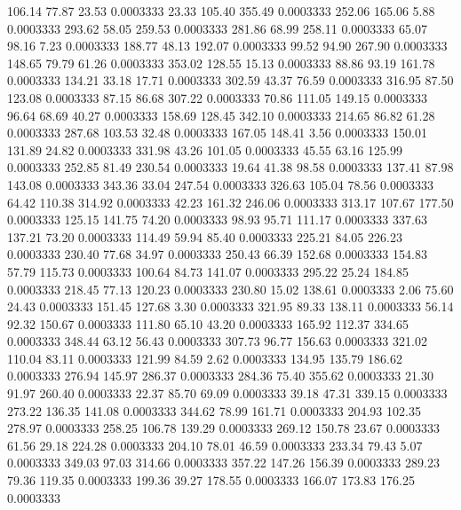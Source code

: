  106.14   77.87   23.53   0.0003333
  23.33  105.40  355.49   0.0003333
 252.06  165.06    5.88   0.0003333
 293.62   58.05  259.53   0.0003333
 281.86   68.99  258.11   0.0003333
  65.07   98.16    7.23   0.0003333
 188.77   48.13  192.07   0.0003333
  99.52   94.90  267.90   0.0003333
 148.65   79.79   61.26   0.0003333
 353.02  128.55   15.13   0.0003333
  88.86   93.19  161.78   0.0003333
 134.21   33.18   17.71   0.0003333
 302.59   43.37   76.59   0.0003333
 316.95   87.50  123.08   0.0003333
  87.15   86.68  307.22   0.0003333
  70.86  111.05  149.15   0.0003333
  96.64   68.69   40.27   0.0003333
 158.69  128.45  342.10   0.0003333
 214.65   86.82   61.28   0.0003333
 287.68  103.53   32.48   0.0003333
 167.05  148.41    3.56   0.0003333
 150.01  131.89   24.82   0.0003333
 331.98   43.26  101.05   0.0003333
  45.55   63.16  125.99   0.0003333
 252.85   81.49  230.54   0.0003333
  19.64   41.38   98.58   0.0003333
 137.41   87.98  143.08   0.0003333
 343.36   33.04  247.54   0.0003333
 326.63  105.04   78.56   0.0003333
  64.42  110.38  314.92   0.0003333
  42.23  161.32  246.06   0.0003333
 313.17  107.67  177.50   0.0003333
 125.15  141.75   74.20   0.0003333
  98.93   95.71  111.17   0.0003333
 337.63  137.21   73.20   0.0003333
 114.49   59.94   85.40   0.0003333
 225.21   84.05  226.23   0.0003333
 230.40   77.68   34.97   0.0003333
 250.43   66.39  152.68   0.0003333
 154.83   57.79  115.73   0.0003333
 100.64   84.73  141.07   0.0003333
 295.22   25.24  184.85   0.0003333
 218.45   77.13  120.23   0.0003333
 230.80   15.02  138.61   0.0003333
   2.06   75.60   24.43   0.0003333
 151.45  127.68    3.30   0.0003333
 321.95   89.33  138.11   0.0003333
  56.14   92.32  150.67   0.0003333
 111.80   65.10   43.20   0.0003333
 165.92  112.37  334.65   0.0003333
 348.44   63.12   56.43   0.0003333
 307.73   96.77  156.63   0.0003333
 321.02  110.04   83.11   0.0003333
 121.99   84.59    2.62   0.0003333
 134.95  135.79  186.62   0.0003333
 276.94  145.97  286.37   0.0003333
 284.36   75.40  355.62   0.0003333
  21.30   91.97  260.40   0.0003333
  22.37   85.70   69.09   0.0003333
  39.18   47.31  339.15   0.0003333
 273.22  136.35  141.08   0.0003333
 344.62   78.99  161.71   0.0003333
 204.93  102.35  278.97   0.0003333
 258.25  106.78  139.29   0.0003333
 269.12  150.78   23.67   0.0003333
  61.56   29.18  224.28   0.0003333
 204.10   78.01   46.59   0.0003333
 233.34   79.43    5.07   0.0003333
 349.03   97.03  314.66   0.0003333
 357.22  147.26  156.39   0.0003333
 289.23   79.36  119.35   0.0003333
 199.36   39.27  178.55   0.0003333
 166.07  173.83  176.25   0.0003333
